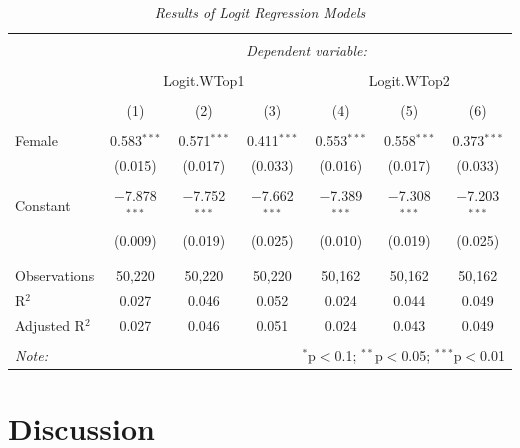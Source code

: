 \documentclass[12pt]{article}
\begin{document}
	\begin{table}[!htbp] \centering 
		\caption{\textit{Results of Logit Regression Models}} 
		\label{} 
		\begin{tabular}{@{\extracolsep{5pt}}lcccccc} 
			\\[-1.8ex]\hline 
			\hline \\[-1.8ex] 
			& \multicolumn{6}{c}{\textit{Dependent variable:}} \\ 
			\cline{2-7} 
			\\[-1.8ex] & \multicolumn{3}{c}{Logit.WTop1} & \multicolumn{3}{c}{Logit.WTop2} \\ 
			\\[-1.8ex] & (1) & (2) & (3) & (4) & (5) & (6)\\ 
			\hline \\[-1.8ex] 
			Female & 0.583$^{***}$ & 0.571$^{***}$ & 0.411$^{***}$ & 0.553$^{***}$ & 0.558$^{***}$ & 0.373$^{***}$ \\ 
			& (0.015) & (0.017) & (0.033) & (0.016) & (0.017) & (0.033) \\ 
			& & & & & & \\ 
			Constant & $-$7.878$^{***}$ & $-$7.752$^{***}$ & $-$7.662$^{***}$ & $-$7.389$^{***}$ & $-$7.308$^{***}$ & $-$7.203$^{***}$ \\ 
			& (0.009) & (0.019) & (0.025) & (0.010) & (0.019) & (0.025) \\ 
			& & & & & & \\ 
			\hline \\[-1.8ex] 
			Observations & 50,220 & 50,220 & 50,220 & 50,162 & 50,162 & 50,162 \\ 
			R$^{2}$ & 0.027 & 0.046 & 0.052 & 0.024 & 0.044 & 0.049 \\ 
			Adjusted R$^{2}$ & 0.027 & 0.046 & 0.051 & 0.024 & 0.043 & 0.049 \\ 
			\hline 
			\hline \\[-1.8ex] 
			\textit{Note:}  & \multicolumn{6}{r}{$^{*}$p$<$0.1; $^{**}$p$<$0.05; $^{***}$p$<$0.01} \\ 
		\end{tabular} 
	\end{table} 
	
	\section{Discussion}
	
\end{document}
